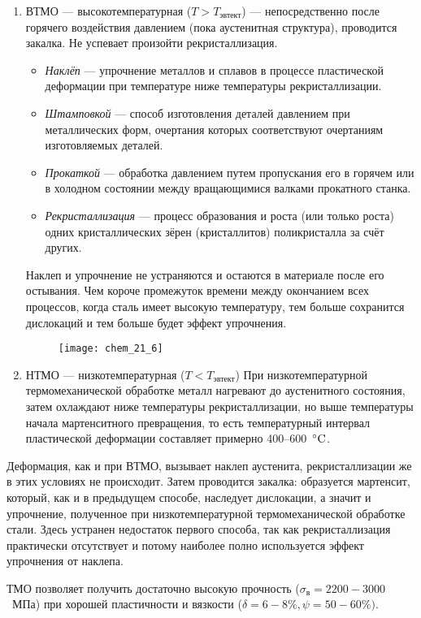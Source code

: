 \begin{enumerate}
    \item ВТМО --- высокотемпературная ($T>T_\text{эвтект}$) --- непосредственно после горячего воздействия давлением (пока аустенитная структура), проводится закалка. Не успевает произойти рекристаллизация.
    \begin{itemize}
        \item \textit{Наклёп} --- упрочнение металлов и сплавов в процессе пластической деформации при температуре ниже температуры рекристаллизации.
        \item \textit{Штамповкой} --- способ изготовления деталей давлением при металлических форм, очертания которых соответствуют очертаниям изготовляемых деталей. 
        \item \textit{Прокаткой} --- обработка давлением путем пропускания его в горячем или в холодном состоянии между вращающимися валками прокатного станка. 
        \item \textit{Рекристаллизация} --- процесс образования и роста (или только роста) одних кристаллических зёрен (кристаллитов) поликристалла за счёт других.
    \end{itemize}
    Наклеп и упрочнение не устраняются и остаются в материале после его остывания.  Чем короче промежуток времени между окончанием всех процессов, когда сталь имеет высокую температуру, тем больше сохранится дислокаций и тем больше будет эффект упрочнения.

    \begin{figure}[h!]
        \centering
        \texttt{[image: chem\_21\_6]}
    \end{figure}

    \item НТМО --- низкотемпературная ($T<T_\text{эвтект}$) 
    При низкотемпературной термомеханической обработке металл нагревают до аустенитного состояния, затем охлаждают ниже температуры рекристаллизации, но выше температуры начала мартенситного превращения, то есть температурный интервал пластической деформации составляет примерно 400--600~$\rm ^\circ C$. 
    
\end{enumerate}




Деформация, как и при ВТМО, вызывает наклеп аустенита, рекристаллизации же в этих условиях не происходит. Затем проводится закалка: образуется мартенсит, который, как и в предыдущем способе, наследует дислокации, а значит и упрочнение, полученное при низкотемпературной термомеханической обработке стали. Здесь устранен недостаток первого способа, так как рекристаллизация практически отсутствует и потому наиболее полно используется эффект упрочнения от наклепа.

ТМО позволяет получить достаточно высокую прочность ($\sigma _\text{в}= 2200-3000$~МПа) при хорошей пластичности и вязкости ($\delta= 6 -8\%, \psi = 50-60\%)$. 
